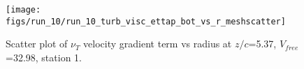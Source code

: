 \begin{figure}[H]
\centering
\texttt{[image: figs/run\_10/run\_10\_turb\_visc\_ettap\_bot\_vs\_r\_meshscatter]}
\caption{Scatter plot of $\nu_T$ velocity gradient term vs radius at $z/c$=5.37, $V_{free}$=32.98, station 1.}
\label{fig:run_10_turb_visc_ettap_bot_vs_r_meshscatter}
\end{figure}


